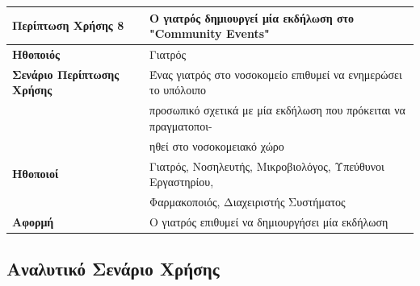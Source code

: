\documentclass{article}
\newcommand\T{\rule{0pt}{2.6ex}}       %
\newcommand\B{\rule[-1.2ex]{0pt}{0pt}}
\begin{document}
\begin{center}
     \begin{tabular}{|l|l|}
     \hline
      \textbf{Περίπτωση Χρήσης 8} & Ο γιατρός δημιουργεί μία εκδήλωση στο "Community Events" \T\B \\ 
      \hline
      \textbf{Ηθοποιός} & Γιατρός \T\B \\
      \hline
      \textbf{Σενάριο Περίπτωσης Χρήσης} & Ένας γιατρός στο νοσοκομείο επιθυμεί να ενημερώσει το υπόλοιπο\T\\& προσωπικό σχετικά με μία εκδήλωση  που πρόκειται να πραγματοποι- \\& ηθεί στο νοσοκομειακό χώρο \B \\
      \hline
      \textbf{Ηθοποιοί} & Γιατρός, Νοσηλευτής, Μικροβιολόγος, Υπεύθυνοι Εργαστηρίου, \T \\& Φαρμακοποιός, Διαχειριστής Συστήματος \B \\
      \hline
      \textbf{Αφορμή} &  Ο γιατρός επιθυμεί να δημιουργήσει μία εκδήλωση\T\B \\
      \hline
     \end{tabular}
 \end{center}
 
  \subsection{Αναλυτικό Σενάριο Χρήσης}
\end{document}
